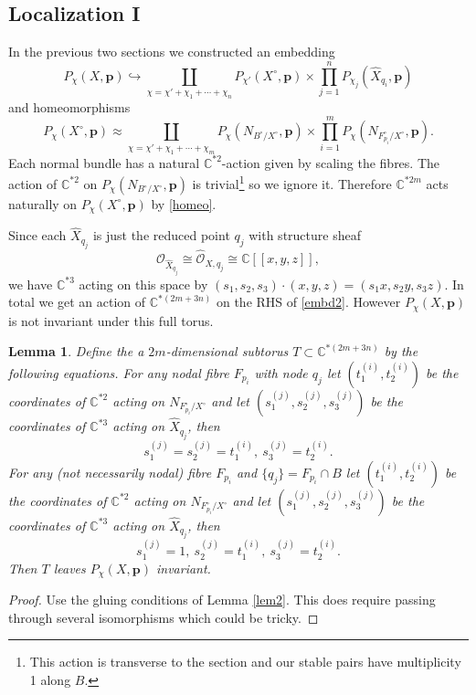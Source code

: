 \documentclass[12pt]{amsart}
\newtheorem{lemma}[theorem]{Lemma}
\theoremstyle{definition}
\theoremstyle{property}
\renewcommand\O{\mathcal O}
\newcommand\p{\mathbf{p}}
\newcommand\C{\mathbb C}
\renewcommand\_{^{}_}
\begin{document}
\subsection{Localization I}

In the previous two sections we constructed an embedding
\begin{equation} \label{embd2}
P_\chi(X,\p) \hookrightarrow \coprod_{\chi = \chi' + \chi_1 +  \cdots + \chi_n}  P_{\chi'}(X^{\circ},\p) \times \prod_{j=1}^{n} P_{\chi_j}(\widehat{X}_{q_i},\p)
\end{equation}
and homeomorphisms
\begin{equation} \label{homeo}
P_{\chi}(X^\circ,\p) \approx \coprod_{\chi = \chi' + \chi_1 + \cdots + \chi_m} P_{\chi}(N_{B^{\circ} / X^\circ}, \p) \times \prod_{i=1}^{m} P_{\chi}(N_{F_{p_i}^{\circ} / X^\circ}, \p).
\end{equation}
Each normal bundle has a natural $\C^{*2}$-action given by scaling the fibres. The action of $\C^{*2}$ on $P_{\chi}(N_{B^{\circ} / X^\circ}, \p)$ is trivial\footnote{This action is transverse to the section and our stable pairs have multiplicity 1 along $B$.} so we ignore it. Therefore $\C^{*2m}$ acts naturally on $P_{\chi}(X^\circ,\p)$ by \eqref{homeo}. 

Since each $\widehat{X}_{q_j}$ is just the reduced point $q_j$ with structure sheaf
\[
\O_{\widehat{X}_{q_j}} \cong \widehat{\O}_{X,q_j} \cong \C [\![x,y,z]\!],
\]
we have $\C^{*3}$ acting on this space by $(s_1,s_2,s_3 ) \cdot (x,y,z) = (s_1 x,s_2 y, s_3 z)$. In total we get an action of $\C^{*(2m+3n)}$ on the RHS of \eqref{embd2}. However $P_\chi(X,\p)$ is not invariant under this full torus.
\begin{lemma}
Define the a $2m$-dimensional subtorus $T \subset \C^{*(2m+3n)}$ by the following equations. For any nodal fibre $F_{p_i}$ with node $q_j$ let $(t_{1}^{(i)}, t_{2}^{(i)})$ be the coordinates of $\C^{*2}$ acting on $N_{F_{p_i}^{\circ} / X^\circ}$ and let $(s_{1}^{(j)},s_{2}^{(j)},s_{3}^{(j)})$ be the coordinates of $\C^{*3}$ acting on $\widehat{X}_{q_j}$, then
\[
s_{1}^{(j)}=s_{2}^{(j)}=t_{1}^{(i)}, \ s_{3}^{(j)} = t_{2}^{(i)}. 
\]
For any (not necessarily nodal) fibre $F_{p_i}$ and $\{q_j\} = F_{p_i} \cap B$ let $(t_{1}^{(i)}, t_{2}^{(i)})$ be the coordinates of $\C^{*2}$ acting on $N_{F_{p_i}^{\circ} / X^\circ}$ and let $(s_{1}^{(j)},s_{2}^{(j)},s_{3}^{(j)})$ be the coordinates of $\C^{*3}$ acting on $\widehat{X}_{q_j}$, then
\[
s_{1}^{(j)}=1, \ s_{2}^{(j)}=t_{1}^{(i)}, \ s_{3}^{(j)} = t_{2}^{(i)}. 
\]
Then $T$ leaves $P_\chi(X,\p)$ invariant.
\end{lemma}
\begin{proof}
Use the gluing conditions of Lemma \ref{lem2}. This does require passing through several isomorphisms which could be tricky.
\end{proof}
\end{document}
